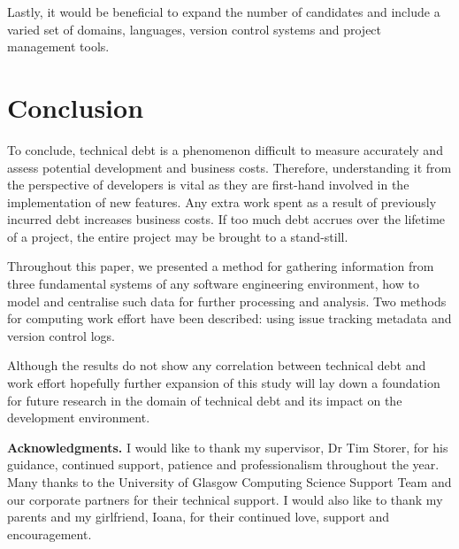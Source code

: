 \documentclass{mpaper}
\begin{document}
Lastly, it would be beneficial to expand the number of candidates and include a
varied set of domains, languages, version control systems and project management
tools.

\section{Conclusion}
\label{conclusion}

To conclude, technical debt is a phenomenon difficult to measure accurately and
assess potential development and business costs. Therefore, understanding it
from the perspective of developers is vital as they are first-hand involved in
the implementation of new features. Any extra work spent as a result of
previously incurred debt increases business costs. If too much debt accrues over
the lifetime of a project, the entire project may be brought to a stand-still.

Throughout this paper, we presented a method for gathering information from
three fundamental systems of any software engineering environment, how to model
and centralise such data for further processing and analysis. Two methods for
computing work effort have been described: using issue tracking metadata and
version control logs. 

Although the results do not show any correlation between technical debt and work
effort hopefully further expansion of this study will lay down a foundation for
future research in the domain of technical debt and its impact on the
development environment.

{\bf Acknowledgments.} I would like to thank my supervisor, Dr Tim Storer, for
his guidance, continued support, patience and professionalism throughout the
year. Many thanks to the University of Glasgow Computing Science Support Team
and our corporate partners for their technical support. I would also like to
thank my parents and my girlfriend, Ioana, for their continued love, support and
encouragement. 



\end{document}
